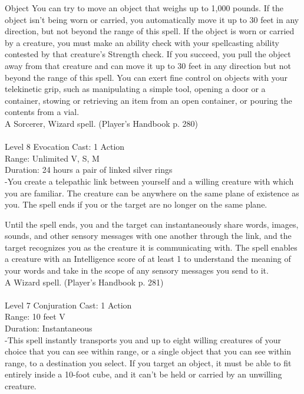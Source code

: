 \documentclass[10pt,twocolumn]{report}
\begin{document}
Object
You can try to move an object that weighs up to 1,000 pounds. If the object isn’t being worn or carried, you automatically move it up to 30 feet in any direction, but not beyond the range of this spell.
If the object is worn or carried by a creature, you must make an ability check with your spellcasting ability contested by that creature’s Strength check. If you succeed, you pull the object away from that creature and can move it up to 30 feet in any direction but not beyond the range of this spell.
You can exert fine control on objects with your telekinetic grip, such as manipulating a simple tool, opening a door or a container, stowing or retrieving an item from an open container, or pouring the contents from a vial.\\
A Sorcerer, Wizard spell. (Player's Handbook p. 280) \\


 \\
Level 8 \quad Evocation \quad Cast: 1 Action\\
Range: Unlimited \quad V, S, M\\
Duration: 24 hours \quad a pair of linked silver rings\\
-You create a telepathic link between yourself and a willing creature with which you are familiar.
The creature can be anywhere on the same plane of existence as you. The spell ends if you or the target are no longer on the same plane.

Until the spell ends, you and the target can instantaneously share words, images, sounds, and other sensory messages with one another through the link, and the target recognizes you as the creature it is communicating with. The spell enables a creature with an Intelligence score of at least 1 to understand the meaning of your words and take in the scope of any sensory messages you send to it.\\
A Wizard spell. (Player's Handbook p. 281) \\


 \\
Level 7 \quad Conjuration \quad Cast: 1 Action\\
Range: 10 feet \quad V\\
Duration: Instantaneous \quad \\
-This spell instantly transports you and up to eight willing creatures of your choice that you can see within range, or a single object that you can see within range, to a destination you select. If you target an object, it must be able to fit entirely inside a 10-foot cube, and it can’t be held or carried by an unwilling creature.
\end{document}
